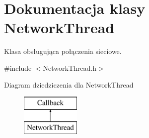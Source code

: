 \section{Dokumentacja klasy Network\+Thread}
\label{class_network_thread}


Klasa obsługująca połączenia sieciowe.  




{\ttfamily \#include $<$Network\+Thread.\+h$>$}

Diagram dziedziczenia dla Network\+Thread\begin{figure}[H]
\begin{center}
\leavevmode
\includegraphics[height=2.000000cm]{class_network_thread}
\end{center}
\end{figure}
